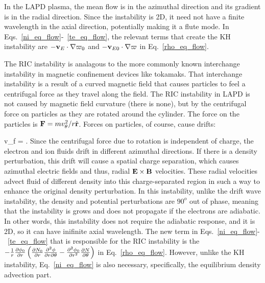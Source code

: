 In the LAPD plasma, the mean flow is in the azimuthal direction and its gradient is in the radial direction. Since the instability is 2D, it need not have a finite wavelength in the axial direction,
potentially making it a flute mode. In Eqs.~\ref{ni_eq_flow}-~\ref{te_eq_flow}, the relevant terms that create the KH instability are 
$- {\mathbf v_E} \cdot \nabla \varpi_0$ and $- {\mathbf v_{E0}} \cdot \nabla \varpi$ in Eq.~\ref{rho_eq_flow}.

The RIC instability is analagous to the more commonly known interchange instability in magnetic confinement devices like tokamaks. That interchange instability is a result of a curved magnetic
field that causes particles to feel a centrifugal force as they travel along the field. The RIC instability in LAPD is not caused by magnetic field curvature (there is none), but by the
centrifugal force on particles as they are rotated around the cylinder. The force on the particles is ${\bf F} = m v_\theta^2/r \hat{{\bf r}}$. Forces on particles, of course, cause drifts:

\beq
\label{force_drift}
v_f =  .
\eeq
Since the centrifugal force due to rotation is independent of charge, the electron and ion fluids drift in different azimuthal directions. If there is a density perturbation, this drift will cause
a spatial charge separation, which causes azimuthal electric fields and thus, radial ${\bf E \times B}$ velocities. 
These radial velocities advect fluid of different density into this charge-separated region in such a way to enhance the original density perturbation. In this instability, unlike the drift wave
instability, the density and potential perturbations are $90^o$ out of phase, meaning that the instability is grows and does not propagate if the electrons are adiabatic. In other words,
this instability does not require the adiabatic response, and it is 2D, so it can have inifinite axial wavelength. The new term in Eqs.~\ref{ni_eq_flow}-~\ref{te_eq_flow} that is responsible
for the RIC instability is the $-\frac{1}{r} \frac{\partial\phi_0}{\partial r} \left(\frac{\partial N_0}{\partial r} \frac{\partial^2\phi}{\partial r \partial\theta} - \frac{\partial^2\phi_0}{\partial r^2} \frac{\partial N}{\partial\theta} \right)$ in Eq.~\ref{rho_eq_flow}.
However, unlike the KH instability, Eq.~\ref{ni_eq_flow} is also necessary, specifically, the equilibrium density advection part.


